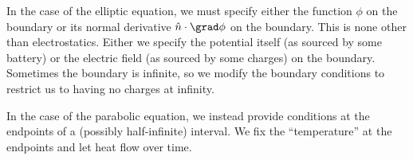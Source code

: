 In the case of the elliptic equation, we must specify either the function $\phi$ on the boundary or its normal derivative $\hat n \cdot \grad \phi$ on the boundary. This is none other than electrostatics. Either we specify the potential itself (as sourced by some battery) or the electric field (as sourced by some charges) on the boundary. Sometimes the boundary is infinite, so we modify the boundary conditions to restrict us to having no charges at infinity.

In the case of the parabolic equation, we instead provide conditions at the endpoints of a (possibly half-infinite) interval. We fix the ``temperature'' at the endpoints and let heat flow over time.


